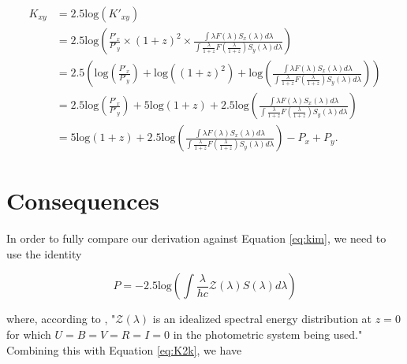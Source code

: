 \documentclass[linenumbers]{aastex631}
\begin{document}
\begin{equation}
\begin{aligned}
\label{eq:K2k}
  K_{xy} &= 2.5\text{log}(K'_{xy}) \\
         &= 2.5\text{log}\left(
            \frac{P'_x}{P'_y} \times (1 + z)^2 \times
            \frac{\int \lambda F(\lambda) S_x(\lambda) d\lambda}
                 {\int \frac{\lambda}{1+z} F\left(\frac{\lambda}{1+z}\right) S_y(\lambda) d\lambda}\right) \\
         &= 2.5 \left(
            \text{log} \left( \frac{P'_x}{P'_y} \right)
            + \text{log}( {(1 + z)^2})
            + \text{log}\left( \frac{\int \lambda F(\lambda) S_x(\lambda) d\lambda}
                   {\int \frac{\lambda}{1+z} F\left(\frac{\lambda}{1+z}\right) S_y(\lambda) d\lambda}
            \right) \right) \\
         &= 2.5 \text{log} \left( \frac{P'_x}{P'_y} \right)
            + 5 \text{log} (1 + z)
            + 2.5 \text{log} \left(
              \frac{\int \lambda F(\lambda) S_x(\lambda) d\lambda}
                   {\int \frac{\lambda}{1+z} F\left(\frac{\lambda}{1+z}\right) S_y(\lambda) d\lambda} \right) \\
         &= 5 \text{log} (1 + z)
            + 2.5 \text{log} \left(
              \frac{\int \lambda F(\lambda) S_x(\lambda) d\lambda}
                   {\int \frac{\lambda}{1+z} F\left(\frac{\lambda}{1+z}\right) S_y(\lambda) d\lambda} \right)
            - P_x + P_y .
\end{aligned}
\end{equation}

\section{Consequences}
\label{sec:consequences}

In order to fully compare our derivation against Equation \ref{eq:kim}, we need
to use the identity

\begin{equation}
  P = -2.5 \text{log} \left( \int \frac{\lambda}{hc} \mathcal{Z}(\lambda) S(\lambda) d\lambda \right)
\end{equation}

\noindent where, according to \citet{kim1996}, "$\mathcal{Z}(\lambda)$ is an
idealized spectral energy distribution at $z = 0$ for which
$U = B = V = R = I = 0$ in the photometric system being used." Combining this
with Equation \ref{eq:K2k}, we have
\end{document}
